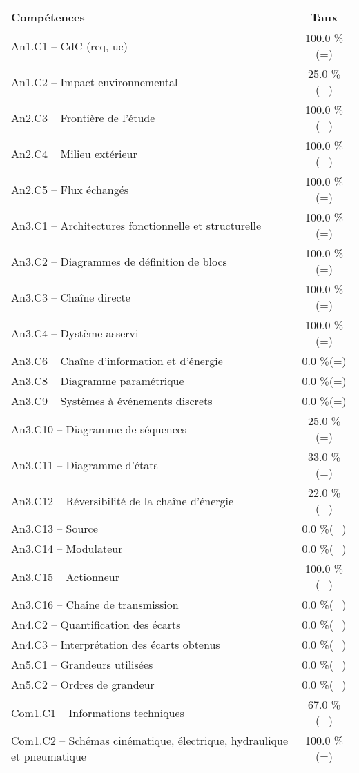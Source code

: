 \footnotesize 
\begin{center} 
\begin{tabular}{|p{.7\linewidth}|c|} 
\hline 
Compétences  & Taux \\ \hline \hline 
An1.C1 -- CdC (req, uc)&100.0 \%(=)\\ \hline 
An1.C2 -- Impact environnemental&25.0 \%(=)\\ \hline 
An2.C3 -- Frontière de l’étude&100.0 \%(=)\\ \hline 
An2.C4 -- Milieu extérieur&100.0 \%(=)\\ \hline 
An2.C5 -- Flux échangés&100.0 \%(=)\\ \hline 
An3.C1 -- Architectures fonctionnelle et structurelle&100.0 \%(=)\\ \hline 
An3.C2 -- Diagrammes de définition de blocs&100.0 \%(=)\\ \hline 
An3.C3 -- Chaîne directe&100.0 \%(=)\\ \hline 
An3.C4 -- Dystème asservi&100.0 \%(=)\\ \hline 
An3.C6 -- Chaîne d’information et d'énergie&0.0 \%(=)\\ \hline 
An3.C8 -- Diagramme paramétrique&0.0 \%(=)\\ \hline 
An3.C9 -- Systèmes à événements discrets&0.0 \%(=)\\ \hline 
An3.C10 -- Diagramme de séquences&25.0 \%(=)\\ \hline 
An3.C11 -- Diagramme d’états&33.0 \%(=)\\ \hline 
An3.C12 -- Réversibilité de la chaîne d’énergie&22.0 \%(=)\\ \hline 
An3.C13 -- Source&0.0 \%(=)\\ \hline 
An3.C14 -- Modulateur&0.0 \%(=)\\ \hline 
An3.C15 -- Actionneur&100.0 \%(=)\\ \hline 
An3.C16 -- Chaîne de transmission&0.0 \%(=)\\ \hline 
An4.C2 -- Quantification des écarts&0.0 \%(=)\\ \hline 
An4.C3 -- Interprétation des écarts obtenus&0.0 \%(=)\\ \hline 
An5.C1 -- Grandeurs utilisées &0.0 \%(=)\\ \hline 
An5.C2 -- Ordres de grandeur&0.0 \%(=)\\ \hline 
Com1.C1 -- Informations techniques&67.0 \%(=)\\ \hline 
Com1.C2 -- Schémas cinématique, électrique, hydraulique et pneumatique&100.0 \%(=)\\ \hline 

\end{tabular}
\end{center}
